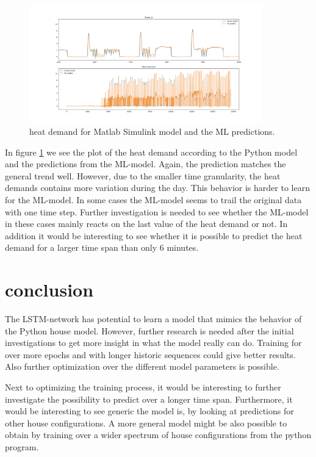 \begin{figure}
	\centering
		\includegraphics[width = 0.9\textwidth]{figures/seq_84_epoch_1000_Python1.png}
		\caption{heat demand for Matlab Simulink model and the ML predictions.}
	\label{fig:python_seq84}
\end{figure}

In figure \ref{fig:python_seq84} we see the plot of the heat demand according to the Python model and the predictions from the ML-model. Again, the prediction matches the general trend well. However, due to the smaller time granularity, the heat demands contains more variation during the day. This behavior is harder to learn for the ML-model. In some cases the ML-model seems to trail the original data with one time step. Further investigation is needed to see whether the ML-model in these cases mainly reacts on the last value of the heat demand or not. In addition it would be interesting to see whether it is possible to predict the heat demand for a larger time span than only 6 minutes. 

\section{conclusion}
The LSTM-network has potential to learn a model that mimics the behavior of the Python house model. However, further research is needed after the initial investigations to get more insight in what the model really can do. Training for over more epochs and with longer historic sequences could give better results.  Also further optimization over the different model parameters is possible. 

Next to optimizing the training process, it would be interesting to further investigate the possibility to predict over a longer time span. Furthermore, it would be interesting to see generic the model is, by looking at predictions for other house configurations. A more general model might be also possible to obtain by training over a wider spectrum of house configurations from the python program. 


